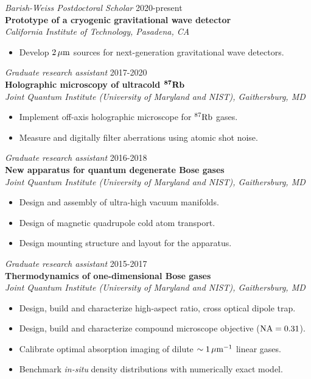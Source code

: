 \documentclass[margin]{res} %
\begin{document}
\begin{resume}
{\sl Barish-Weiss Postdoctoral Scholar} \hfill 2020-present \\
{\bf Prototype of a cryogenic gravitational wave detector}\\
{\it California Institute of Technology, Pasadena, CA}
\begin{itemize} \itemsep -2pt
\item Develop $2\,{\rm \mu m}$ sources for next-generation gravitational wave detectors.
\end{itemize} 

{\sl Graduate research assistant} \hfill 2017-2020 \\
{\bf Holographic microscopy of ultracold ${\bf ^{87} {\rm \bf Rb}}$}\\
{\it Joint Quantum Institute (University of Maryland and NIST), Gaithersburg, MD}
\begin{itemize} \itemsep -2pt
\item Implement off-axis holographic microscope for ${^{87} {\rm Rb}}$ gases.
\item Measure and digitally filter aberrations using atomic shot noise.
\end{itemize} 

{\sl Graduate research assistant} \hfill 2016-2018 \\
{\bf New apparatus for quantum degenerate Bose gases}\\
{\it Joint Quantum Institute (University of Maryland and NIST), Gaithersburg, MD}
\begin{itemize} \itemsep -2pt
\item Design and assembly of ultra-high vacuum manifolds.
\item Design of magnetic quadrupole cold atom transport.
\item Design mounting structure and layout for the apparatus.
\end{itemize}

{\sl Graduate research assistant} \hfill 2015-2017 \\
{\bf Thermodynamics of one-dimensional Bose gases} \\
{\it Joint Quantum Institute (University of Maryland and NIST), Gaithersburg, MD}
\begin{itemize} \itemsep -2pt
\item Design, build and characterize high-aspect ratio, cross optical dipole trap.
\item Design, build and characterize compound microscope objective (${{\rm NA} = 0.31}$).
\item Calibrate optimal absorption imaging of dilute ${\sim 1 \,{\rm \mu m ^{-1}}}$ linear gases.
\item Benchmark {\it in-situ} density distributions with numerically exact model.
\end{itemize} 


\end{resume}
\end{document}
